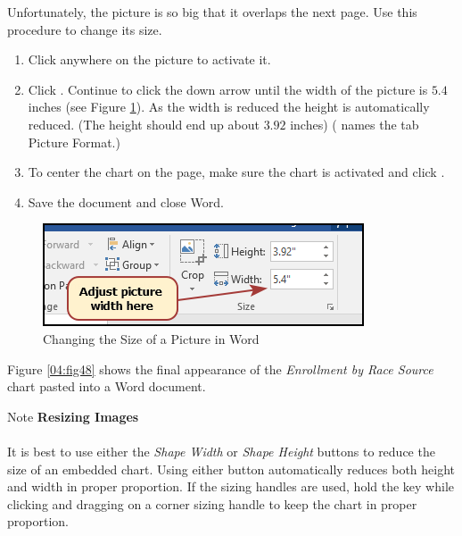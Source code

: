 Unfortunately, the picture is so big that it overlaps the next page. Use this procedure to change its size.

\begin{enumerate}
	\item Click anywhere on the picture to activate it.
	\item Click . Continue to click the down arrow until the width of the picture is $ 5.4 $ inches (see Figure \ref{04:fig47}). As the width is reduced the height is automatically reduced. (The height should end up about $ 3.92 $ inches) ( names the tab Picture Format.)
	\item To center the chart on the page, make sure the chart is activated and click . 
	\item Save the document and close Word.
\end{enumerate}

\begin{figure}[H]
	\centering
	\includegraphics[width=\maxwidth{.75\linewidth}]{gfx/ch04_fig47}
	\caption{Changing the Size of a Picture in Word}
	\label{04:fig47}
\end{figure}

Figure \ref{04:fig48} shows the final appearance of the \textit{Enrollment by Race Source} chart pasted into a Word document. 

\begin{center}
	\begin{infobox}{Note}
		\textbf{Resizing Images}
		\\
		\\
		It is best to use either the \textit{Shape Width} or \textit{Shape Height} buttons to reduce the size of an embedded chart. Using either button automatically reduces both height and width in proper proportion. If the sizing handles are used, hold the  key while clicking and dragging on a corner sizing handle to keep the chart in proper proportion.
	\end{infobox}
\end{center}

